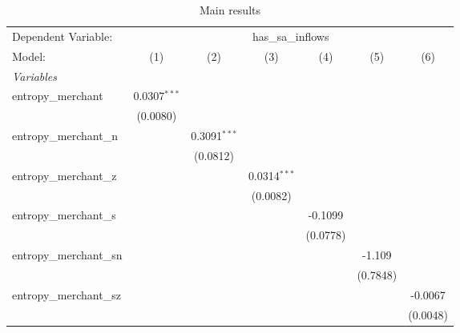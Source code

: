 
\begin{table}[htbp]
   \centering
   \footnotesize
   \begin{threeparttable}[b]
      \caption{\label{tab:reg_has_sa_inflows_merchant.tex} Main results}
      \begin{tabular}{lcccccc}
         \tabularnewline \midrule \midrule
         Dependent Variable: & \multicolumn{6}{c}{has\_sa\_inflows}\\
         Model:                  & (1)            & (2)            & (3)            & (4)            & (5)            & (6)\\  
         \midrule
         \emph{Variables}\\
         entropy\_merchant       & 0.0307$^{***}$ &                &                &                &                &   \\   
                                 & (0.0080)       &                &                &                &                &   \\   
         entropy\_merchant\_n    &                & 0.3091$^{***}$ &                &                &                &   \\   
                                 &                & (0.0812)       &                &                &                &   \\   
         entropy\_merchant\_z    &                &                & 0.0314$^{***}$ &                &                &   \\   
                                 &                &                & (0.0082)       &                &                &   \\   
         entropy\_merchant\_s    &                &                &                & -0.1099        &                &   \\   
                                 &                &                &                & (0.0778)       &                &   \\   
         entropy\_merchant\_sn   &                &                &                &                & -1.109         &   \\   
                                 &                &                &                &                & (0.7848)       &   \\   
         entropy\_merchant\_sz   &                &                &                &                &                & -0.0067\\   
                                 &                &                &                &                &                & (0.0048)\\   

\end{tabular}
\end{threeparttable}
\end{table}
